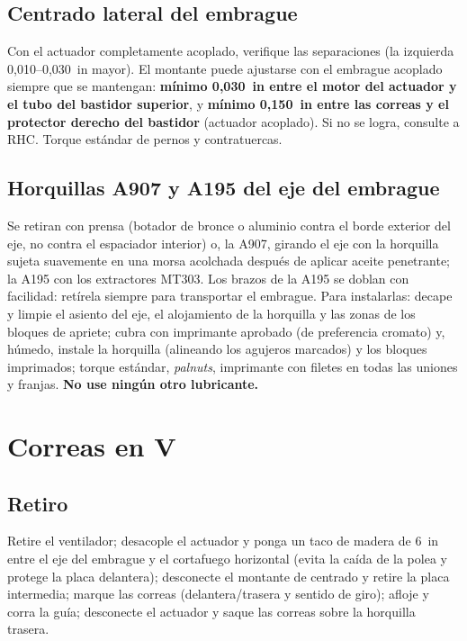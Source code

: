 \subsection{Centrado lateral del embrague}

Con el actuador completamente acoplado, verifique las separaciones (la izquierda 0,010--0,030~in mayor). El montante puede ajustarse con el embrague acoplado siempre que se mantengan: \textbf{mínimo 0,030~in entre el motor del actuador y el tubo del bastidor superior}, y \textbf{mínimo 0,150~in entre las correas y el protector derecho del bastidor} (actuador acoplado). Si no se logra, consulte a RHC. Torque estándar de pernos y contratuercas.

\subsection{Horquillas A907 y A195 del eje del embrague}

Se retiran con prensa (botador de bronce o aluminio contra el borde exterior del eje, no contra el espaciador interior) o, la A907, girando el eje con la horquilla sujeta suavemente en una morsa acolchada después de aplicar aceite penetrante; la A195 con los extractores MT303. Los brazos de la A195 se doblan con facilidad: retírela siempre para transportar el embrague. Para instalarlas: decape y limpie el asiento del eje, el alojamiento de la horquilla y las zonas de los bloques de apriete; cubra con imprimante aprobado (de preferencia cromato) y, húmedo, instale la horquilla (alineando los agujeros marcados) y los bloques imprimados; torque estándar, \emph{palnuts}, imprimante con filetes en todas las uniones y franjas. \textbf{No use ningún otro lubricante.}

\section{Correas en V}

\subsection{Retiro}

Retire el ventilador; desacople el actuador y ponga un taco de madera de 6~in entre el eje del embrague y el cortafuego horizontal (evita la caída de la polea y protege la placa delantera); desconecte el montante de centrado y retire la placa intermedia; marque las correas (delantera/trasera y sentido de giro); afloje y corra la guía; desconecte el actuador y saque las correas sobre la horquilla trasera.

